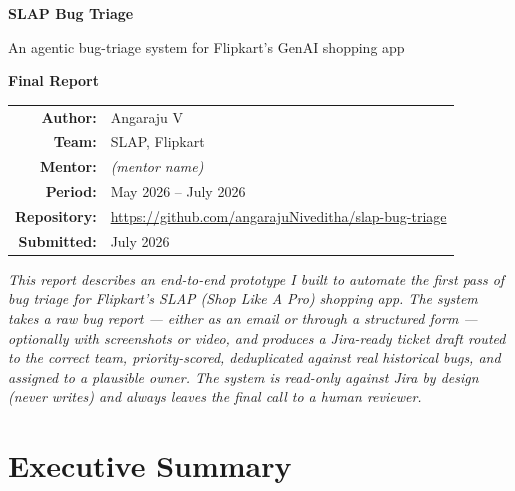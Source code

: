 \documentclass[11pt,a4paper]{article}
\begin{document}
\begin{titlepage}
\centering
\vspace*{2cm}
{\Huge\bfseries\color{slappink} SLAP Bug Triage\par}
\vspace{0.3cm}
{\Large An agentic bug-triage system for Flipkart's GenAI shopping app\par}
\vspace{2cm}

{\large\bfseries Final Report\par}
\vspace{1.5cm}

\begin{tabular}{rl}
\textbf{Author:}     & Angaraju V \\
\textbf{Team:}       & SLAP, Flipkart \\
\textbf{Mentor:}     & \textit{(mentor name)} \\
\textbf{Period:}     & May 2026 -- July 2026 \\
\textbf{Repository:} & \url{https://github.com/angarajuNiveditha/slap-bug-triage} \\
\textbf{Submitted:}  & July 2026 \\
\end{tabular}

\vfill

\begin{minipage}{0.85\textwidth}
\small\itshape
This report describes an end-to-end prototype I built to automate the first pass
of bug triage for Flipkart's SLAP (Shop Like A Pro) shopping app. The system
takes a raw bug report --- either as an email or through a structured form ---
optionally with screenshots or video, and produces a Jira-ready ticket draft
routed to the correct team, priority-scored, deduplicated against real
historical bugs, and assigned to a plausible owner. The system is read-only
against Jira by design (never writes) and always leaves the final call to a
human reviewer.
\end{minipage}

\end{titlepage}

\tableofcontents
\newpage

\section{Executive Summary}
\end{document}
